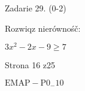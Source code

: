\documentclass[a4paper,12pt]{article}
\begin{document}
Zadarie 29. (0-2)

Rozwiqz nierównośč:

$3x^{2}-2x-9\geq 7$

Strona 16 z25

$\mathrm{E}\mathrm{M}\mathrm{A}\mathrm{P}-\mathrm{P}0_{-}10$
\end{document}
